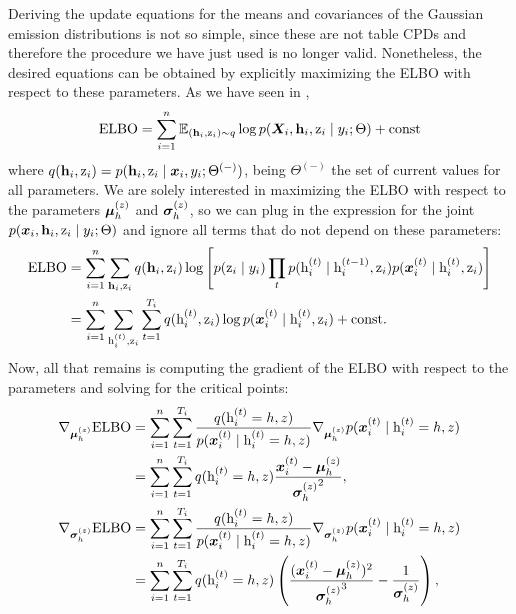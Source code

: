 Deriving the update equations for the means and covariances of the Gaussian emission distributions is not so simple, since these are not table CPDs and therefore the procedure we have just used is no longer valid. Nonetheless, the desired equations can be obtained by explicitly maximizing the ELBO with respect to these parameters. As we have seen in ,
\begin{equation}
	\label{eq:mhmm_elbo}
	\mathrm{ELBO} = \sum_{i=1}^{n} \mathbb{E}_{({\mathbf{h}}_i,{\textnormal{z}}_i) \sim q} \log p({\bm{X}}_i, {\mathbf{h}}_i, {\textnormal{z}}_i \mid y_i; \Theta) + \text{const}
\end{equation}
where $q({\mathbf{h}}_i,{\textnormal{z}}_i) = p({\mathbf{h}}_i, {\textnormal{z}}_i \mid {\bm{x}}_i, y_i; \Theta^{(-)})$, being $\Theta^{(-)}$ the set of current values for all parameters. We are solely interested in maximizing the ELBO with respect to the parameters ${\bm{\mu}}^{(z)}_h$ and ${\bm{\sigma}}^{(z)}_h$, so we can plug in the expression for the joint $p({\bm{x}}_i, {\mathbf{h}}_i, {\textnormal{z}}_i \mid y_i; \Theta)$ and ignore all terms that do not depend on these parameters:
\begin{align}
	\label{eq:mhmm_elbo_gaussian_params}
	\mathrm{ELBO} &= \sum_{i=1}^n \sum_{{\mathbf{h}}_i, {\textnormal{z}}_i} q({\mathbf{h}}_i,{\textnormal{z}}_i) \log \left[p({\textnormal{z}}_i \mid y_i) \prod_t p({\textnormal{h}}^{(t)}_i \mid {\textnormal{h}}^{(t-1)}_i, {\textnormal{z}}_i) p({\bm{x}}^{(t)}_i \mid {\textnormal{h}}^{(t)}_i, {\textnormal{z}}_i) \right] \nonumber\\
	&= \sum_{i=1}^n \sum_{{\textnormal{h}}^{(t)}_i, {\textnormal{z}}_i} \sum_{t=1}^{T_i} q({\textnormal{h}}^{(t)}_i, {\textnormal{z}}_i) \log p({\bm{x}}^{(t)}_i \mid {\textnormal{h}}^{(t)}_i, {\textnormal{z}}_i) + \text{const}.
\end{align}
Now, all that remains is computing the gradient of the ELBO with respect to the parameters and solving for the critical points:
\begin{align}
&\nabla_{\vmu^{(z)}_h} \mathrm{ELBO} = \sum_{i=1}^n \sum_{t=1}^{T_i} \frac{q(\rh^{(t)}_i=h, z)}{p(\vx^{(t)}_i \mid \rh^{(t)}_i=h, z)} \nabla_{\vmu^{(z)}_h} p(\vx^{(t)}_i \mid \rh^{(t)}_i=h, z) \nonumber\\
&\hphantom{\nabla_{\vmu^{(z)}_h} \mathrm{ELBO}} = \sum_{i=1}^n  \sum_{t=1}^{T_i} q(\rh^{(t)}_i=h, z) \frac{\vx^{(t)}_i - \vmu^{(z)}_h}{{\vsigma^{(z)}_h}^2}, \\
&\nabla_{\vsigma^{(z)}_h} \mathrm{ELBO} = \sum_{i=1}^n \sum_{t=1}^{T_i} \frac{q(\rh^{(t)}_i=h, z)}{p(\vx^{(t)}_i \mid \rh^{(t)}_i=h, z)} \nabla_{\vsigma^{(z)}_h} p(\vx^{(t)}_i \mid \rh^{(t)}_i=h, z) \nonumber\\
&\hphantom{\nabla_{\vsigma^{(z)}_h} \mathrm{ELBO}} = \sum_{i=1}^n  \sum_{t=1}^{T_i} q(\rh^{(t)}_i=h, z) \left(\frac{(\vx^{(t)}_i - \vmu^{(z)}_h)^2}{{\vsigma^{(z)}_h}^3} - \frac{1}{\vsigma^{(z)}_h}\right),
\end{align}
